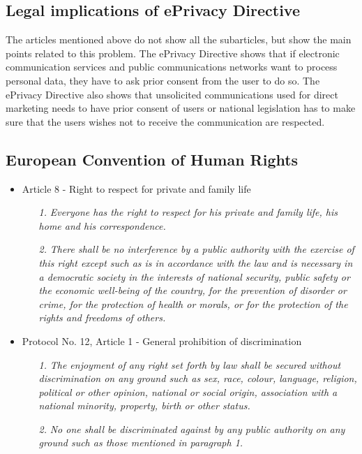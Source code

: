 \documentclass[11pt]{article}
\newcommand{\ePD}{ePrivacy Directive }
\begin{document}
\subsection{Legal implications of \ePD}

The articles mentioned above do not show all the subarticles, but show the main points related to this problem. The \ePD shows that if electronic communication services and public communications networks want to process personal data, they have to ask prior consent from the user to do so. The \ePD also shows that unsolicited communications used for direct marketing needs to have prior consent of users or national legislation has to make sure that the users wishes not to receive the communication are respected.


\subsection{European Convention of Human Rights}
\begin{itemize}
	\item Article 8 - Right to respect for private and family life
		\begin{itemize}
			\item [\textit{1.}] {\it Everyone has the right to respect for his private and family life, his home and his correspondence.}
			\item [\textit{2.}] {\it There shall be no interference by a public authority with the exercise of this right except such as is in accordance with the law and is necessary in a democratic society in the interests of national security, public safety or the economic well-being of the country, for the prevention of disorder or crime, for the protection of health or morals, or for the protection of the rights and freedoms of others.}
		\end{itemize}
	\item Protocol No. 12, Article 1 - General prohibition of discrimination 
		\begin{itemize}
			\item [\textit{1.}] {\it The enjoyment of any right set forth by law shall be secured without discrimination on any ground such as sex, race, colour, language, religion, political or other opinion, national or social origin, association with a national minority, property, birth or other status.}
			\item [\textit{2.}] {\it No one shall be discriminated against by any public authority on any ground such as those mentioned in paragraph 1.}
		\end{itemize}
\end{itemize}
\end{document}
